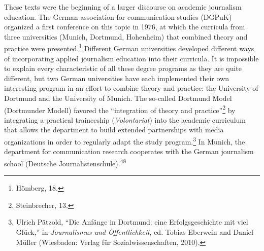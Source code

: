 \documentclass{tufte-handout}
\begin{document}
These texts were the beginning of a larger discourse on academic
journalism education. The German association for communication studies
(DGPuK) organized a first conference on this topic in 1976, at which the
curricula from three universities (Munich, Dortmund, Hohenheim) that
combined theory and practice were presented.\footnote{Hömberg, 18.}
Different German universities developed different ways of incorporating
applied journalism education into their curricula. It is impossible to
explain every characteristic of all these degree programs as they are
quite different, but two German universities have each implemented their
own interesting program in an effort to combine theory and practice: the
University of Dortmund and the University of Munich. The so-called
Dortmund Model (Dortmunder Modell) favored the ``integration of theory
and practice''\footnote{Steinbrecher, 13.} by integrating a practical
traineeship (\emph{Volontariat}) into the academic curriculum that
allows the department to build extended partnerships with media
organizations in order to regularly adapt the study program.\footnote{Ulrich
  Pätzold, ``Die Anfänge in Dortmund: eine Erfolgsgeschichte mit viel
  Glück,'' in \emph{Journalismus und Öffentlichkeit}, ed. Tobias
  Eberwein and Daniel Müller (Wiesbaden: Verlag für
  Sozialwissenschaften, 2010).} In Munich, the department for
communication research cooperates with the German journalism school
(Deutsche Journalistenschule).\textsuperscript{48}
\end{document}
